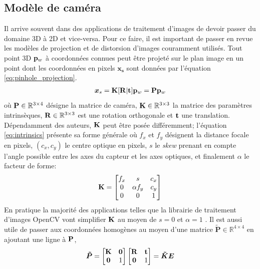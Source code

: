 \subsection{Modèle de caméra}
\label{subsec:modele_camera}
Il arrive souvent dans des applications de traitement d'images de devoir passer du domaine 3D à 2D et vice-versa. Pour ce faire, il est important de passer en revue les modèles de projection et de distorsion d'images couramment utilisés. Tout point 3D $\mathbf{p}_w$ à coordonnées connues peut être projeté sur le plan image en un point dont les coordonnées en pixels $\boldsymbol{x_s}$ sont données par l'équation \ref{eq:pinhole_projection}.
\begin{align}
\boldsymbol{x}_s = \mathbf{K}[\mathbf{R}|\mathbf{t}]\mathbf{p}_w = \mathbf{P} \mathbf{p}_w
\label{eq:pinhole_projection}
\end{align}
où $\mathbf{P} \in \mathbb{R}^{3\times 4}$ désigne la matrice de caméra, $\mathbf{K} \in \mathbb{R}^{3\times3}$ la matrice des paramètres intrinsèques, $\mathbf{R}\in \mathbb{R}^{3\times3}$ est une rotation orthogonale et $\mathbf{t}$ une translation. Dépendamment des auteurs, $\mathbf{K}$ peut être posée différemment; l'équation \ref{eq:intrinsics} présente sa forme générale où $f_x$ et $f_y$ désignent la distance focale en pixels, $(c_x, c_y)$ le centre optique en pixels, $s$ le \textit{skew} prenant en compte l'angle possible entre les axes du capteur et les axes optiques, et finalement $\alpha$ le facteur de forme:
\begin{align}
  \mathbf{K} = \begin{bmatrix}
  f_x & s & c_x \\
  0   & \alpha f_y & c_y \\
  0  &  0  & 1
\end{bmatrix}
\label{eq:intrinsics}
\end{align}
En pratique la majorité des applications telles que la librairie de traitement d'images OpenCV vont simplifier $\mathbf{K}$ au moyen de $s = 0$ et $\alpha = 1$ \citep{itseez2015}. Il est aussi utile de passer aux coordonnées homogènes au moyen d'une matrice $\boldsymbol{\tilde{P}} \in \mathbb{R}^{4\times4}$ en ajoutant une ligne à $\mathbf{P}$,
\begin{align}
  \boldsymbol{\tilde{P}} = \begin{bmatrix}\mathbf{K} & \boldsymbol{0} \\ \boldsymbol{0} & 1\end{bmatrix}
  \begin{bmatrix}\mathbf{R} & \mathbf{t} \\ \boldsymbol{0} & 1\end{bmatrix} = \boldsymbol{\tilde{K}} \boldsymbol{E}
    \label{eq:homogeneous_projection}
\end{align}

